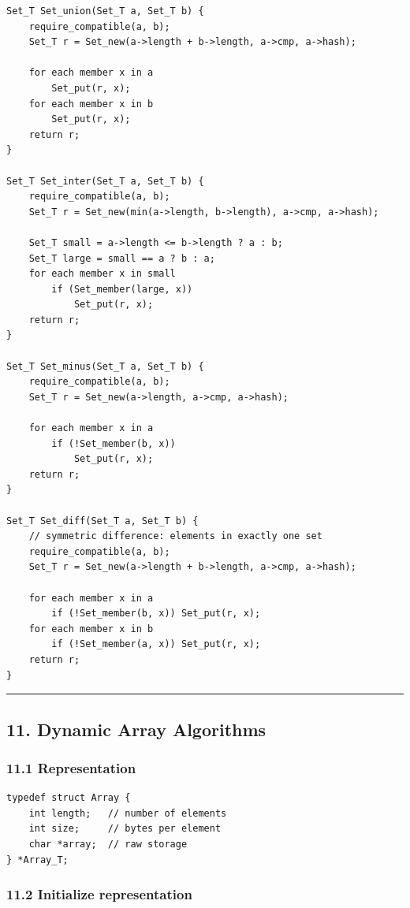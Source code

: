 \documentclass[11pt]{article}
\begin{document}
\begin{verbatim}
Set_T Set_union(Set_T a, Set_T b) {
    require_compatible(a, b);
    Set_T r = Set_new(a->length + b->length, a->cmp, a->hash);

    for each member x in a
        Set_put(r, x);
    for each member x in b
        Set_put(r, x);
    return r;
}

Set_T Set_inter(Set_T a, Set_T b) {
    require_compatible(a, b);
    Set_T r = Set_new(min(a->length, b->length), a->cmp, a->hash);

    Set_T small = a->length <= b->length ? a : b;
    Set_T large = small == a ? b : a;
    for each member x in small
        if (Set_member(large, x))
            Set_put(r, x);
    return r;
}

Set_T Set_minus(Set_T a, Set_T b) {
    require_compatible(a, b);
    Set_T r = Set_new(a->length, a->cmp, a->hash);

    for each member x in a
        if (!Set_member(b, x))
            Set_put(r, x);
    return r;
}

Set_T Set_diff(Set_T a, Set_T b) {
    // symmetric difference: elements in exactly one set
    require_compatible(a, b);
    Set_T r = Set_new(a->length + b->length, a->cmp, a->hash);

    for each member x in a
        if (!Set_member(b, x)) Set_put(r, x);
    for each member x in b
        if (!Set_member(a, x)) Set_put(r, x);
    return r;
}
\end{verbatim}

\begin{center}\rule{0.5\linewidth}{0.5pt}\end{center}

\subsection{11. Dynamic Array Algorithms}\label{dynamic-array-algorithms}

\subsubsection{11.1 Representation}\label{representation-3}

\begin{verbatim}
typedef struct Array {
    int length;   // number of elements
    int size;     // bytes per element
    char *array;  // raw storage
} *Array_T;
\end{verbatim}

\subsubsection{11.2 Initialize representation}\label{initialize-representation}
\end{document}
